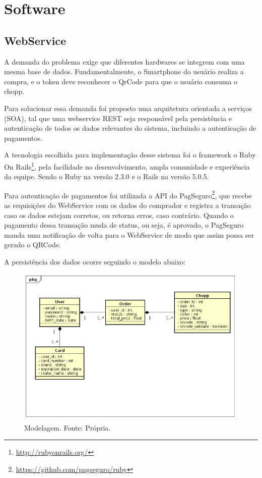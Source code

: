 \chapter[Software]{Software}

    \section[WebService]{WebService}

        A demanda do problema exige que diferentes hardwares se integrem com uma
        mesma base de dados. Fundamentalmente, o Smartphone do usuário realiza a compra, e
        o token deve reconhecer o QrCode para que o usuário consuma o chopp.
        
        Para solucionar essa demanda foi proposto uma arquitetura orientada a serviços
        (SOA), tal que uma webservice REST seja responsável pela persistência e autenticação de todos os
        dados relevantes do sistema, incluindo a autenticação de pagamentos.

        A tecnologia escolhida para implementação desse sistema foi o framework o 
        Ruby On Rails\footnote{\url{http://rubyonrails.org/}}, pela facilidade no desenvolvimento, 
        ampla comunidade e experiência da equipe. Sendo o Ruby na versão 2.3.0 e o Rails na versão 5.0.5.

        Para autenticação de pagamentos foi utilizada a API do PagSeguro\footnote{\url{https://github.com/pagseguro/ruby}},
        que recebe as requisições do WebService com os dados do comprador e registra a transação caso os dados estejam corretos,
        ou retorna erros, caso contrário. Quando o pagamento dessa transação muda de status, ou seja, é aprovado, o PagSeguro
        manda uma notificação de volta para o WebService de modo que assim possa ser gerado o QRCode.

        A persistência dos dados ocorre seguindo o modelo abaixo:

        \begin{figure}[H]
            \centering
            \includegraphics[scale= 0.4]{figuras/Diagrama-de-classes.png}
            \caption{Modelagem. Fonte: Própria.}
            \label{modelagem}
        \end{figure}


